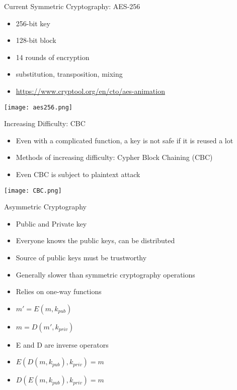 \begin{withoutheadline}
\begin{frame}{Current Symmetric Cryptography: AES-256}
    \begin{itemize}
        \item 256-bit key
        \item 128-bit block
        \item 14 rounds of encryption
        \item substitution, transposition, mixing
        \item \url{https://www.cryptool.org/en/cto/aes-animation}
    \end{itemize}
    \texttt{[image: aes256.png]}
\end{frame}

\begin{frame}{Increasing Difficulty: CBC}
    \begin{itemize}
        \item Even with a complicated function, a key is not safe if it is reused a lot
        \item Methods of increasing difficulty: Cypher Block Chaining (CBC)
        \item Even CBC is subject to plaintext attack
    \end{itemize}
    \texttt{[image: CBC.png]}
\end{frame}

\begin{frame}{Asymmetric Cryptography}
    \begin{itemize}
        \item Public and Private key
        \item Everyone knows the public keys, can be distributed
        \item Source of public keys must be trustworthy
        \item Generally slower than symmetric cryptography operations
        \item Relies on one-way functions
        \item $m' =E(m, k_{pub})$
        \item $m = D(m', k_{priv})$
        \item E and D are inverse operators
        \item $E(D(m, k_{pub}), k_{priv}) = m$
        \item $D(E(m, k_{pub}), k_{priv}) = m$
    \end{itemize}
\end{frame}


\end{withoutheadline}
